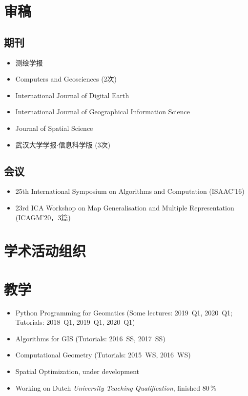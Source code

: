 \documentclass{resume}
\begin{document}
\section{审稿}
\subsection{期刊}
\begin{itemize}[parsep=0ex]
\item 测绘学报
\item Computers and Geosciences (2次)
\item International Journal of Digital Earth
\item International Journal of Geographical Information Science
\item Journal of Spatial Science
\item 武汉大学学报$\cdot$信息科学版 (3次)
\end{itemize}

\subsection{会议}
\begin{itemize}[parsep=0ex]
\item 25th International Symposium on Algorithms and Computation (ISAAC'16)
\item 23rd ICA Workshop on
    Map Generalisation and Multiple Representation (ICAGM'20，3篇)
\end{itemize}

\section{学术活动组织}
\begin{itemize}[parsep=0ex]
\end{itemize}

\section{教学}
\begin{itemize}[parsep=0ex]
\item Python Programming for Geomatics
    (Some lectures: 2019~Q1\footnotemark, 2020~Q1; Tutorials: 2018~Q1, 2019~Q1, 2020~Q1)
\item Algorithms for GIS
    (Tutorials: 2016~SS\footnotemark, 2017~SS)
\item Computational Geometry
    (Tutorials: 2015~WS, 2016~WS)
\item Spatial Optimization, under development
\item Working on Dutch \emph{University Teaching Qualification}, 
    finished 80\,\%
\end{itemize}
\end{document}

